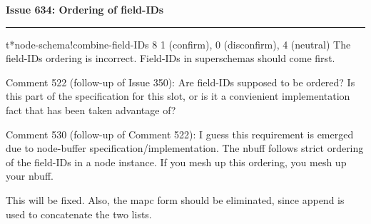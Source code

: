 {\large\bf Issue 634: Ordering of field-IDs}
\hrule \medskip

\begin{llist}
 t*node-schema!combine-field-IDs
 8
 1 (confirm), 0 (disconfirm), 4 (neutral)
 The field-IDs ordering is incorrect. Field-IDs in
superschemas should come first.

\begin{itemizenoindent}
\item Comment 522 (follow-up of Issue 350): Are
    field-IDs supposed to be ordered? Is this part of the
    specification for this slot, or is it a convienient
    implementation fact that has been taken advantage of?

  
\item Comment 530 (follow-up of Comment 522): I guess
    this requirement is emerged due to node-buffer
    specification/implementation. The nbuff follows strict
    ordering of the field-IDs in a node instance.  If you
    mesh up this ordering, you mesh up your nbuff.
\end{itemizenoindent}

This will be fixed.  Also, the mapc form should be eliminated, since append
is used to concatenate the two lists. 
\end{llist}


